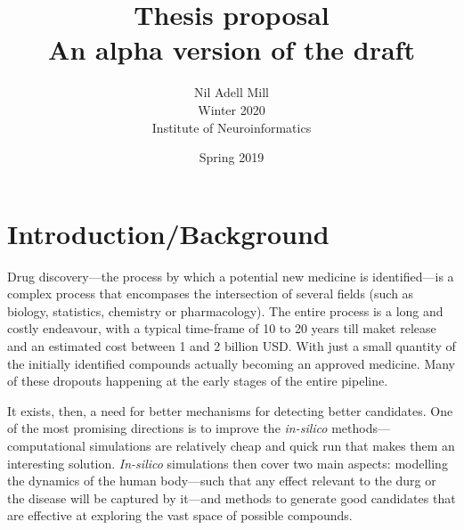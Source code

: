 \documentclass{article}
\begin{document}
\title{\Large Thesis proposal \\ \small An alpha version of the draft}
\author{Nil Adell Mill \\
        Winter 2020 \\
        Institute of Neuroinformatics \\}
\date{Spring 2019}

\maketitle

    \section*{Introduction/Background}  

Drug discovery—the process by which a potential new medicine is identified---is a
 complex process that encompases the intersection of several fields (such as biology,
 statistics, chemistry or pharmacology). The entire process is a long and costly
 endeavour, with a typical time-frame of 10 to 20 years till maket release and an
 estimated cost between 1 and 2 billion USD. With just a small quantity of the initially
 identified compounds actually becoming an approved medicine. Many of these dropouts
 happening at the early stages of the entire pipeline.

It exists, then, a need for better mechanisms for detecting better candidates. One of
 the most promising directions is to improve the \emph{in-silico}
 methods---computational simulations are relatively cheap and quick run that makes them
 an interesting solution. \emph{In-silico} simulations then cover two main aspects:
 modelling the dynamics of the human body---such that any effect relevant to the durg or
 the disease will be captured by it---and methods to generate good candidates that are
 effective at exploring the vast space of possible compounds.



\end{document}
